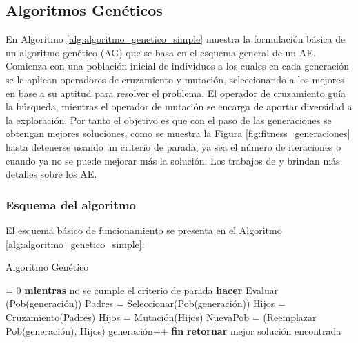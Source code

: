 \subsection{Algoritmos Genéticos}
En Algoritmo \ref{alg:algoritmo_genetico_simple} muestra la formulación básica de un algoritmo genético (AG) que se basa en el esquema general de un AE. Comienza con una población inicial de individuos a los cuales en cada generación se le aplican operadores de cruzamiento y mutación, seleccionando a los mejores en base a su aptitud para resolver el problema. El operador de cruzamiento guía la búsqueda, mientras el operador de mutación se encarga de aportar diversidad a la exploración. Por tanto el objetivo es que con el paso de las generaciones se obtengan mejores soluciones, como se muestra la Figura \ref{fig:fitness_generaciones} hasta detenerse usando un criterio de parada, ya sea el número de iteraciones o cuando ya no se puede mejorar más la solución. Los trabajos de \citet{Goldberg1989} y \citet{Mitchell1996} brindan más detalles sobre los AE.

\subsubsection{Esquema del algoritmo}

El esquema básico de funcionamiento se presenta en el Algoritmo \ref{alg:algoritmo_genetico_simple}:


\begin{algorithm}[ht]
	\caption{Algoritmo Genético}
	\label{alg:algoritmo_genetico_simple}
	\begin{algorithmic} [1] 
		{
			 = 0
			\STATE \textbf{mientras} {no se cumple el criterio de parada} \textbf{hacer}
			\STATE\hspace{\algorithmicindent} {Evaluar (Pob(generación))}
			\STATE\hspace{\algorithmicindent} {Padres = Seleccionar(Pob(generación))}
			\STATE\hspace{\algorithmicindent} {Hijos = Cruzamiento(Padres)}
			\STATE\hspace{\algorithmicindent} {Hijos = Mutación(Hijos)}
			\STATE\hspace{\algorithmicindent} {NuevaPob = (Reemplazar Pob(generación), Hijos)}
			\STATE\hspace{\algorithmicindent} {generación}++
			\STATE \textbf{fin}
			\STATE \textbf{retornar} mejor solución encontrada
		}
	\end{algorithmic}
\end{algorithm}


